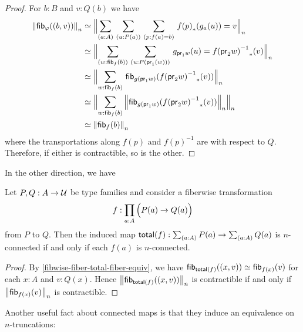 \begin{proof}
For $b:B$ and $v:Q(b)$ we have
{\allowdisplaybreaks
\begin{align*}
\trunc n{\hfib{\varphi}{\pairr{b,v}}} & \eqvsym \Trunc n{\sm{a:A}{u:P(a)}{p:f(a)= b} \trans{\ap f p }{g_a(u)}= v}\\
& \eqvsym \Trunc n{\sm{w:\hfib{f}b}{u:P(\proj1(w))} g_{\proj 1 w}(u)= \trans{\opp{\ap f {\proj2 w}}}{v}}\\
& \eqvsym \Trunc n{\sm{w:\hfib{f}b} \hfib{g(\proj1 w)}{\trans{\opp{\ap f {\proj 2 w}}}{v}}}\\
& \eqvsym \Trunc n{\sm{w:\hfib{f}b} \trunc n{\hfib{g(\proj1 w)}{\trans{\opp{\ap f {\proj 2 w}}}{v}}}}\\
& \eqvsym \trunc n{\hfib{f}b}
\end{align*}}
where the transportations along $f(p)$ and $f(p)^{-1}$ are with respect to $Q$.
Therefore, if either is contractible, so is the other.
\end{proof}

In the other direction, we have

\begin{lem}\label{prop:nconn_fiber_to_total}
Let $P,Q:A\to\type$ be type families and consider a fiberwise transformation
\begin{equation*}
f:\prd{a:A} \Parens{P(a)\to Q(a)}
\end{equation*}
from $P$ to $Q$. Then the induced map $\total f: \sm{a:A}P(a) \to \sm{a:A} Q(a)$ is $n$-connected if and only if each $f(a)$ is $n$-connected. 
\end{lem}

\begin{proof}
By \autoref{fibwise-fiber-total-fiber-equiv}, we have
$\hfib{\total f}{\pairr{x,v}}\eqvsym\hfib{f(x)}v$
for each $x:A$ and $v:Q(x)$. Hence $\trunc n{\hfib{\total f}{\pairr{x,v}}}$ is contractible if and only if
$\trunc n{\hfib{f(x)}v}$ is contractible.
\end{proof}

Another useful fact about connected maps is that they induce an
equivalence on $n$-truncations:

